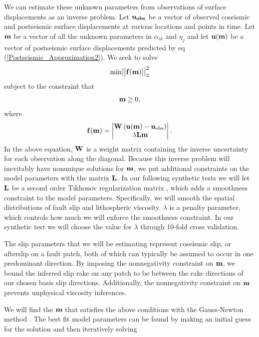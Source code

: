 \documentclass[12pt]{article}
\begin{document}
We can estimate these unknown parameters from observations of surface
displacements as an inverse problem. Let $\bold{u_{obs}}$ be a vector
of observed coseismic and postseismic surface displacements at various
locations and points in time.  Let $\bold{m}$ be a vector of all the
unknown parameters in $\alpha_{ik}$ and $\eta_j$ and let $\bold{u(m)}$
be a vector of postseismic surface displacements predicted by eq
(\ref{Postseismic_Approximation2}). We seek to solve
\begin{equation}\label{Inverse_Problem}
  \mathrm{min}
  \big|\big|\bold{f(m)}\big|\big|_2^2
\end{equation}
subject to the constraint that
\begin{equation}
  \bold{m}\geq0,
\end{equation}
where 
\begin{equation}
  \bold{f(m)} = 
    \begin{vmatrix}
      \bold{W}\left(\bold{u(m)}-\bold{u}_{\mathrm{obs}}\right)\\
      \lambda\bold{Lm}\\
    \end{vmatrix} .
\end{equation}  
In the above equation, $\bold{W}$ is a weight matrix containing the
inverse uncertainty for each observation along the diagonal. Because
this inverse problem will inevitably have nonunique solutions for
$\bold{m}$, we put additional constraints on the model parameters with
the matrix $\bold{L}$.  In our following synthetic tests we will let
$\bold{L}$ be a second order Tikhonov regularization matrix
\citep{TA1978}, which adds a smoothness constraint to the model
parameters.  Specifically, we will smooth the spatial distributions of
fault slip and lithospheric viscosity.  $\lambda$ is a penalty
parameter, which controls how much we will enforce the smoothness
constraint.  In our synthetic test we will choose the value for
$\lambda$ through 10-fold cross validation.

The slip parameters that we will be estimating represent coseismic
slip, or afterslip on a fault patch, both of which can typically be
assumed to occur in one predominant direction.  By imposing the
nonnegativity constraint on $\bold{m}$, we bound the inferred slip
rake on any patch to be between the rake directions of our chosen
basis slip directions.  Additionally, the nonnegativity constraint on
$\bold{m}$ prevents unphysical viscosity inferences.

We will find the $\bold{m}$ that satisfies the above conditions with
the Gauss-Newton method \citep{A2013}.  The best fit model parameters
can be found by making an initial guess for the solution and then
iteratively solving
\end{document}
